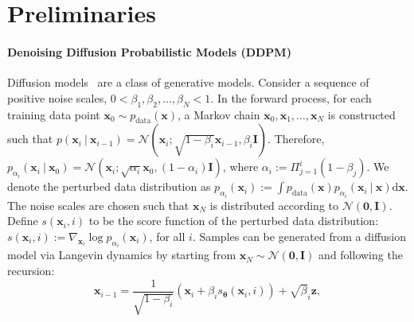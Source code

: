 \section{Preliminaries}

\paragraph{Denoising Diffusion Probabilistic Models (DDPM)} 
Diffusion models~\citep{ho2020denoising, sohl2015deep} are a class of generative models.
%
Consider a sequence of positive noise scales, $0 < \beta_1, \beta_2, \ldots, \beta_N < 1$.
%
In the forward process, for each training data point $\mathbf{x}_0 \sim p_{\mathrm{data}}(\mathbf{x})$, a Markov chain $\mathbf{x}_0, \mathbf{x}_1,\ldots,\mathbf{x}_N$ is constructed such that $p(\mathbf{x}_i \ |\ \mathbf{x}_{i-1}) = \mathcal{N}(\mathbf{x}_i; \sqrt{1 - \beta_i}\mathbf{x}_{i-1}, \beta_i\mathbf{I})$.
%
Therefore, $p_{\alpha_i}(\mathbf{x}_i\ |\ \mathbf{x}_0) = {\mathcal{N}(\mathbf{x}_i; \sqrt{\alpha_i}\mathbf{x}_0, (1-\alpha_i)\mathbf{I})}$, where $\alpha_i := \Pi_{j=1}^i (1 - \beta_j)$.
%
We denote the perturbed data distribution as $p_{\alpha_i}(\mathbf{x}_i) := \int p_{\mathrm{data}}(\mathbf{x}) p_{\alpha_i}(\mathbf{x}_i \ |\ \mathbf{x}) \mathrm{d}\mathbf{x}$.
%
The noise scales are chosen such that $\mathbf{x}_N$ is distributed according to $\mathcal{N}(\mathbf{0}, \mathbf{I})$.
%
%
Define $s(\mathbf{x}_i, i)$ to be the score function of the perturbed data distribution: $s(\mathbf{x}_i, i) := \nabla_{\mathbf{x}_i} \log p_{\alpha_i}(\mathbf{x}_i)$, for all $i$.
%
%
Samples can be generated from a diffusion model via Langevin dynamics by starting from $\mathbf{x}_N \sim \mathcal{N}(\mathbf{0}, \mathbf{I})$ and following the recursion:
\begin{equation}
    \mathbf{x}_{i-1} = \frac{1}{\sqrt{1 - \beta_i}}(\mathbf{x}_i + \beta_i s_{\mathbf{\theta}}(\mathbf{x}_i, i) ) + \sqrt{\beta}_i \mathbf{z}, \label{eq:diffusion_sample}
\end{equation}
